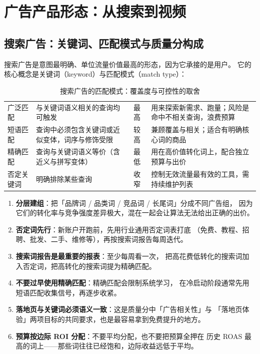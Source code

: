 \section{广告产品形态：从搜索到视频}

\subsection{搜索广告：关键词、匹配模式与质量分构成}

搜索广告是意图最明确、单位流量价值最高的形态，因为它承接的是用户。
它的核心概念是关键词（keyword）与匹配模式（match type）：

\begin{table}[htbp]
\centering
\caption{搜索广告的匹配模式：覆盖度与可控性的取舍}
\label{tab:match-types}
\small
\begin{tabularx}{\textwidth}{L{2.4cm} L{3.4cm} L{3.0cm} Y}
\toprule
{} &  &  &  \\
\midrule
广泛匹配 & 与关键词语义相关的查询均可触发 & 最高 & 用来探索新需求、跑量；风险是命中不相关查询，浪费预算 \\
\addlinespace
短语匹配 & 查询中必须包含关键词或近似变体，词序与修饰受限 & 较高 & 兼顾覆盖与相关；适合有明确核心词的商品 \\
\addlinespace
精确匹配 & 查询与关键词语义等价（含近义与拼写变体） & 最低 & 用在高价值转化词上，配合独立预算与出价 \\
\addlinespace
否定关键词 & 明确排除某些查询 & 收窄 & 控制无效流量最有效的工具，需持续维护列表 \\
\bottomrule
\end{tabularx}
\end{table}

\begin{toolbox}[关键词结构的实操建议]
\begin{enumerate}
  \item \textbf{分层建组}：把「品牌词 / 品类词 / 竞品词 / 长尾词」分成不同广告组，
        因为它们的转化率与竞争强度差异极大，混在一起会让算法无法给出正确的出价。
  \item \textbf{否定词先行}：新账户开跑前，先用行业通用否定词表打底
        （免费、教程、招聘、批发、二手、维修等），再按搜索词报告每周迭代。
  \item \textbf{搜索词报告是最重要的报表}：至少每周看一次，
        把高花费低转化的搜索词加入否定词，把高转化的搜索词提为精确匹配。
  \item \textbf{不要过早使用精确匹配}：精确匹配会限制系统学习，
        在冷启动阶段通常先用短语匹配收集信号，再逐步收紧。
  \item \textbf{落地页与关键词必须语义一致}：这是质量分中「广告相关性」与
        「落地页体验」两项目标的共同要求，也是最容易拿到免费提升的地方。
  \item \textbf{预算按边际 ROI 分配}：不要平均分配，也不要把预算全押在
        历史 ROAS 最高的词上——那些词往往已经饱和，边际收益远低于平均。
\end{enumerate}
\end{toolbox}

